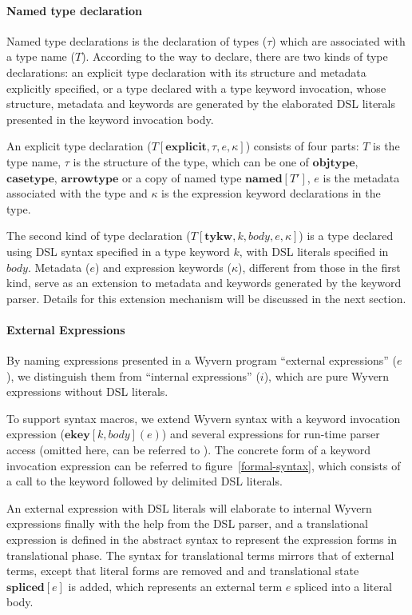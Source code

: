 \documentclass{sig-alternate}
\begin{document}
\paragraph{Named type declaration}
Named type declarations is the declaration of types ($\tau$) which are associated with a type name ($T$). 
According to the way to declare, there are two kinds of type declarations: an explicit type declaration with its structure and metadata explicitly specified, or a type declared with a type keyword invocation, whose structure, metadata and keywords are generated by the elaborated DSL literals presented in the keyword invocation body.

An explicit type declaration ($T[\mathbf{explicit}, \tau,e,\kappa]$) consists of four parts: $T$ is the type name, $\tau$ is the structure of the type, which can be one of $\mathbf{objtype}$, $\mathbf{casetype}$, $\mathbf{arrowtype}$ or a copy of named type $\mathbf{named}[T']$,  $e$ is the metadata associated with the type and $\kappa$ is the expression keyword declarations in the type.

The second kind of type declaration ($T[\mathbf{tykw},k,body,e,\kappa]$) is a type declared using DSL syntax specified in a type keyword $k$, with DSL literals specified in $body$. Metadata ($e$) and expression keywords ($\kappa$), different from those in the first kind, serve as an extension to metadata and keywords generated by the keyword parser. Details for this extension mechanism will be discussed in the next section.

\paragraph{External Expressions}
By naming expressions presented in a Wyvern program ``external expressions'' ($e$), we distinguish them from ``internal expressions'' ($i$), which are pure Wyvern expressions without DSL literals. 

To support syntax macros, we extend Wyvern syntax with a keyword invocation expression ($\mathbf{ekey}[k,body](e)$) and several expressions for run-time parser access (omitted here, can be referred to ). The concrete form of a keyword invocation expression can be referred to figure~\ref{formal-syntax}, which consists of a call to the keyword followed by delimited DSL literals. 

An external expression with DSL literals will elaborate to internal Wyvern expressions finally with the help from the DSL parser, and a translational expression  
is defined in the abstract syntax to represent the expression forms in translational phase. The syntax for translational terms mirrors that of external terms, except that literal forms are removed and and translational state $\mathbf{spliced}[e]$ is added, which represents an external term $e$ spliced into a literal body.
\end{document}
